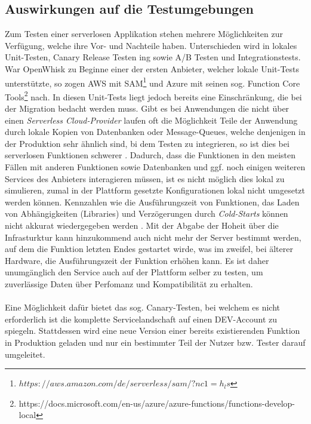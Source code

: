 \documentclass[11pt]{article}
\begin{document}
\subsection{Auswirkungen auf die Testumgebungen}
Zum Testen einer serverlosen Applikation stehen mehrere Möglichkeiten zur Verfügung, welche ihre Vor- und Nachteile haben. Unterschieden wird in lokales Unit-Testen, Canary Release Testen ing sowie A/B Testen und Integrationstests. War OpenWhisk zu Beginne einer der ersten Anbieter, welcher lokale Unit-Tests unterstützte, so zogen AWS mit SAM\footnote{$https://aws.amazon.com/de/serverless/sam/?nc1=h_ls$} und Azure mit seinen sog. Function Core Tools\footnote{https://docs.microsoft.com/en-us/azure/azure-functions/functions-develop-local} nach. In diesen Unit-Tests liegt jedoch bereits eine Einschränkung, die bei der Migration bedacht werden muss. Gibt es bei Anwendungen die nicht über einen \textit{Serverless Cloud-Provider} laufen oft die Möglichkeit Teile der Anwendung durch lokale Kopien von Datenbanken oder Message-Queues, welche denjenigen in der Produktion sehr ähnlich sind, bi dem Testen zu integrieren, so ist dies bei serverlosen Funktionen schwerer \cite{roberts2017serverless}.  Dadurch, dass die Funktionen in den meisten Fällen mit anderen Funktionen sowie Datenbanken und ggf. noch einigen weiteren Services des Anbieters interagieren müssen, ist es nicht möglich dies lokal zu simulieren, zumal in der Plattform gesetzte Konfigurationen lokal nicht umgesetzt werden können. Kennzahlen wie die Ausführungszeit von Funktionen, das Laden von Abhängigkeiten (Libraries) und Verzögerungen durch \textit{Cold-Starts} können nicht akkurat wiedergegeben werden \cite{racicot2019quality}. Mit der Abgabe der Hoheit über die Infrasturktur kann hinzukommend auch nicht mehr der Server bestimmt werden, auf dem die Funktion letzten Endes gestartet wirde, was im zweifel, bei älterer Hardware, die Ausführungszeit der Funktion erhöhen kann. Es ist daher unumgänglich den Service auch auf der Plattform selber zu testen, um zuverlässige Daten über Perfomanz und Kompatibilität zu erhalten. \\\\
Eine Möglichkeit dafür bietet das sog. Canary-Testen, bei welchem es nicht erforderlich ist die komplette Servicelandschaft auf einen DEV-Account zu spiegeln. Stattdessen wird eine neue Version einer bereits existierenden Funktion in Produktion geladen und nur ein bestimmter Teil der Nutzer bzw. Tester darauf umgeleitet. 
\end{document}
